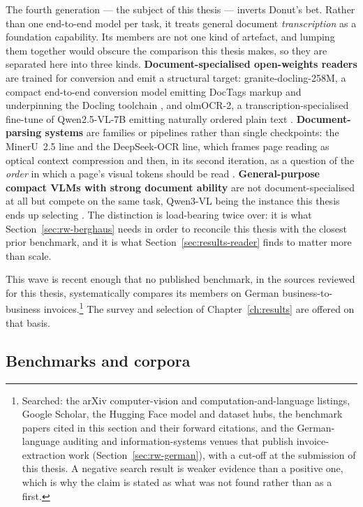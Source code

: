 The fourth generation --- the subject of this thesis --- inverts Donut's bet. Rather than
one end-to-end model per task, it treats general document \emph{transcription} as a
foundation capability. Its members are not one kind of artefact, and lumping them together
would obscure the comparison this thesis makes, so they are separated here into three kinds.
\textbf{Document-specialised open-weights readers} are trained for conversion and emit a
structural target: granite-docling-258M, a compact end-to-end conversion model emitting
DocTags markup \parencite{granitedocling} and underpinning the Docling toolchain
\parencite{docling2025}, and olmOCR-2, a transcription-specialised fine-tune of Qwen2.5-VL-7B
emitting naturally ordered plain text \parencite{olmocr2}. \textbf{Document-parsing systems} are
families or pipelines rather than single checkpoints: the MinerU~2.5 line
\parencite{wang2026mineru} and the DeepSeek-OCR line, which frames page reading as optical
context compression \parencite{deepseekocr2025} and then, in its second iteration, as a
question of the \emph{order} in which a page's visual tokens should be read
\parencite{deepseekocr2026}. \textbf{General-purpose
compact \acp{VLM} with strong document ability} are not document-specialised at all but
compete on the same task, Qwen3-VL being the instance this thesis ends up selecting
\parencite{qwen3vl}. The distinction is load-bearing twice over: it is what
Section~\ref{sec:rw-berghaus} needs in order to reconcile this thesis with the closest prior
benchmark, and it is what Section~\ref{sec:results-reader} finds to matter more than scale.

This wave is recent enough that no published benchmark, in the sources reviewed for this
thesis, systematically compares its members on German business-to-business
invoices.\footnote{Searched: the arXiv computer-vision and computation-and-language
listings, Google Scholar, the Hugging Face model and dataset hubs, the benchmark papers
cited in this section and their forward citations, and the German-language auditing and
information-systems venues that publish invoice-extraction work (Section~\ref{sec:rw-german}),
with a cut-off at the submission of this thesis. A negative search result is weaker
evidence than a positive one, which is why the claim is stated as what was not found rather
than as a first.} The survey and selection of Chapter~\ref{ch:results} are offered on that
basis.

\subsection{Benchmarks and corpora}

